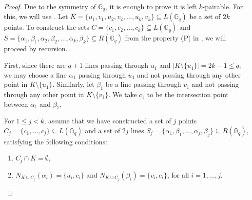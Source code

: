 \documentclass[a4paper,UKenglish,cleveref, autoref, thm-restate]{arxiv}
\newcommand{\ls}{\leqslant}
\newcommand{\G}[1][q]{\mathbb{G}_{#1}}
\begin{document}
\begin{proof}
    Due to the symmetry of $\G$, it is enough to prove it is left $k$-pairable. For this, we will use  . Let  $K = \{u_1,v_1, u_2,v_2, \dots, u_k, v_k\} \subseteq L(\G)$ be a set of $2k$  points. To construct the sets $C = \{c_1, c_2,\dots, c_k \} \subseteq L(\G)$ and  $S = \{\alpha_1,\beta_1, \alpha_2,\beta_2, \dots, \alpha_k, \beta_k\} \subseteq R(\G)$ from  the property (P)  in , we will proceed by recursion. 

    \medskip \noindent First, since there are $q+1$ lines passing through $u_1$ and $|K\setminus\{u_1\}| = 2k-1 \ls q$, we may choose a line $\alpha_1$ passing through $u_1$ and  not passing through any other point in  $K\setminus\{u_1\}$. Similarly, let $\beta_1$ be a line passing through $v_1$ and  not passing through any other point in  $K\setminus\{v_1\}$. We take  $c_1$ to be the intersection point between $\alpha_1$ and $\beta_1$.

    \medskip \noindent For $1\ls j < k$, assume that we have constructed a set of $j$ points $C_j = \{c_1, \dots, c_j \} \subseteq L(\G)$ and a set of $2j$ lines $S_j = \{\alpha_1,\beta_1,  \dots, \alpha_j, \beta_j\} \subseteq R(\G)$, satisfying the following conditions:
    \begin{enumerate}
        \item $C_j \cap K = \emptyset$,
        \item $N_{K \cup C_j} (\alpha_i) = \{u_i, c_i\}$ and $N_{K \cup C_j} (\beta_i) = \{v_i, c_i\}$, for all $i=1,\dots,j$.
    \end{enumerate}


\end{proof}
\end{document}
